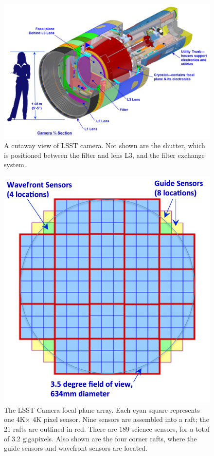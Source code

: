 \begin{figure}[t!]
\hskip -0.05in
\includegraphics[width=1.05\hsize,clip]{CameraFigureUpdated2017.pdf}
\caption{A cutaway view of LSST camera. Not shown are the shutter, which is positioned between the filter and lens L3, and the filter exchange system.}
\label{Fig:camera}
\end{figure}


\begin{figure}[ht]
\includegraphics[width=1.0\hsize,clip]{fov-updated-cropped.pdf}
\caption{The LSST Camera focal plane array. Each cyan square represents one
4K$\times$ 4K pixel sensor. Nine sensors are assembled into a
raft; the 21 rafts are outlined in red. There are 189 science sensors, for a total of 3.2 gigapixels. Also shown are the four corner rafts, where the guide sensors and wavefront sensors are located.}
\label{Fig:fov}
\end{figure}

